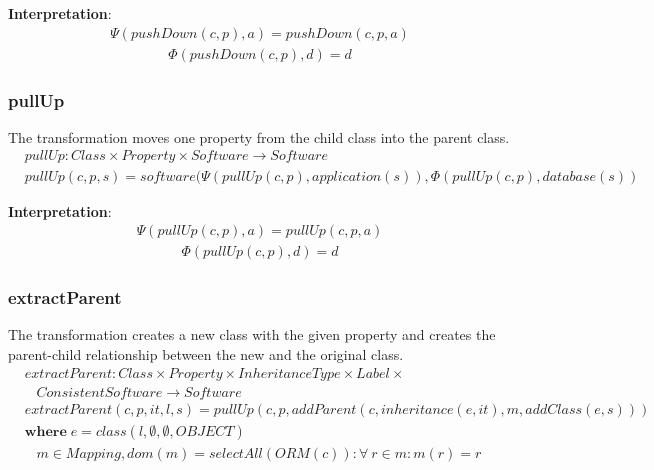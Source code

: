 \documentclass[10pt]{article}
\begin{document}
\noindent \textbf{Interpretation}:
\begin{align}
\Psi(pushDown(c, p), a) = pushDown(c, p, a)
\end{align}
\begin{align}
\Phi(pushDown(c, p), d) = d
\end{align}

\subsubsection{pullUp}
The transformation moves one property from the child class into the parent class.
\begin{align}
& pullUp: Class \times Property \times Software \rightarrow Software \nonumber \\
& pullUp(c, p, s) = software(\Psi(pullUp(c, p), application(s)), \Phi(pullUp(c, p), database(s))
\end{align}

\noindent \textbf{Interpretation}:
\begin{align}
\Psi(pullUp(c, p), a) = pullUp(c, p, a)
\end{align}
\begin{align}
\Phi(pullUp(c, p), d) = d
\end{align}

\subsubsection{extractParent}
The transformation creates a new class with the given property and creates the parent-child relationship between the new and the original class.
\begin{align}
& extractParent: Class \times Property \times InheritanceType \times Label \times  \nonumber \\
& \;\;\; ConsistentSoftware \rightarrow Software \\
& extractParent(c, p, it, l, s) = pullUp(c, p, addParent(c,inheritance(e, it), m,  addClass(e, s))) \\
& \mathbf{where} \; e = class(l, \emptyset, \emptyset, OBJECT)  \nonumber \\
& \;\;\; m \in Mapping, dom(m) = selectAll(ORM(c)) : \forall \: r \in m :  m(r) = r \nonumber
\end{align}
\end{document}
